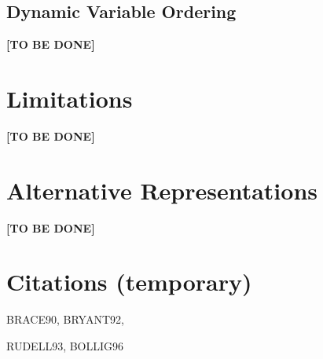 \documentclass{vldb}
\newcommand{\tbd}{\textbf{[TO BE DONE]}}
\begin{document}
\subsection{Dynamic Variable Ordering}
\label{subsec:dynamic-variable-ordering}

\tbd

\section{Limitations}
\label{sec:limitations}

\tbd

\section{Alternative Representations}
\label{sec:alternative-representations}

\tbd

\section{Citations (temporary)}

\noindent
\par
BRACE90\cite{BRACE90}, BRYANT92\cite{BRYANT92},
\par
RUDELL93\cite{RUDELL93}, BOLLIG96\cite{BOLLIG96}


\balance



\end{document}
